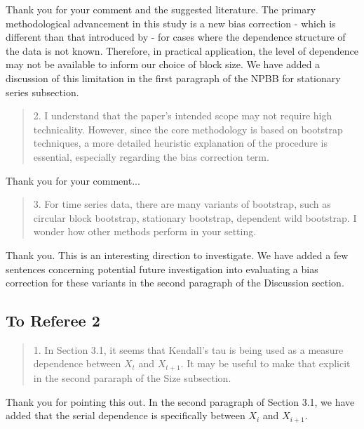 \documentclass[12pt]{article}
\newenvironment{comment}%
{\begin{quotation}\noindent\small\it\color{darkblue}\ignorespaces%
}{\end{quotation}}
\begin{document}
Thank you for your comment and the suggested literature. The primary 
methodological 
advancement in this study is a new bias correction - which is different than 
that introduced by \citet{babu2004goodness} - for cases where the dependence
structure of the data is not known. Therefore, in practical application,
the level of dependence may not be available to inform our choice of block
size. We have added a discussion of this limitation in the first paragraph of 
the NPBB for stationary
series subsection.



\begin{comment}
2. I understand that the paper’s intended scope may not require high 
technicality. However,
since the core methodology is based on bootstrap techniques, a more detailed 
heuristic
explanation of the procedure is essential, especially regarding the bias 
correction term.
\end{comment}

Thank you for your comment...



\begin{comment}
3. For time series data, there are many variants of bootstrap, such as circular 
block bootstrap,
stationary bootstrap, dependent wild bootstrap. I wonder how other methods 
perform in
your setting.
\end{comment} 

Thank you. This is an interesting direction to investigate. We have added a few
sentences concerning potential future investigation into evaluating a bias 
correction for these variants in the second paragraph of the Discussion 
section.



\subsection*{To Referee 2}

\begin{comment}
1. In Section 3.1, it seems that Kendall's tau is being used as a measure
dependence between $X_t$ and $X_{t+1}$. It may be useful to make that explicit 
in the
second pararaph of the Size subsection.
\end{comment}

Thank you for pointing this out. In the second paragraph of Section 3.1, 
we have added that the
serial dependence is specifically between $X_i$ and $X_{i+1}$.
\end{document}
